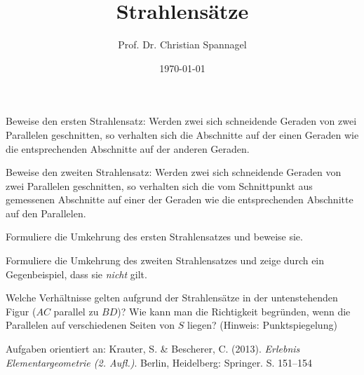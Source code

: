 \documentclass{cssheet}
\title{Strahlensätze}
\author{Prof. Dr. Christian Spannagel}
\date{\today}
\begin{document}
\printtitle

\begin{aufgabe} 
	Beweise den ersten Strahlensatz: Werden zwei sich schneidende Geraden von zwei Parallelen geschnitten, so verhalten sich die Abschnitte auf der einen Geraden wie die entsprechenden Abschnitte auf der anderen Geraden.
\end{aufgabe}

\begin{aufgabe} 
	Beweise den zweiten Strahlensatz: Werden zwei sich schneidende Geraden von zwei Parallelen geschnitten, so verhalten sich die vom Schnittpunkt aus gemessenen Abschnitte auf einer der Geraden wie die entsprechenden Abschnitte auf den Parallelen.
\end{aufgabe}

\begin{aufgabe} 
	Formuliere die Umkehrung des ersten Strahlensatzes und beweise sie.
\end{aufgabe}

\begin{aufgabe} 
	Formuliere die Umkehrung des zweiten Strahlensatzes und zeige durch ein Gegenbeispiel, dass sie \emph{nicht} gilt.
\end{aufgabe}

\begin{aufgabe} 
	Welche Verhältnisse gelten aufgrund der Strahlensätze in der untenstehenden Figur ($AC$ parallel zu $BD$)? Wie kann man die Richtigkeit begründen, wenn die Parallelen auf verschiedenen Seiten von $S$ liegen? (Hinweis: Punktspiegelung)
\end{aufgabe}

\vspace*{10mm}

Aufgaben orientiert an: Krauter, S. \& Bescherer, C. (2013). \emph{Erlebnis Elementargeometrie (2. Aufl.)}. Berlin, Heidelberg: Springer. S. 151–154

\printlicense

\printsocials
\end{document}
